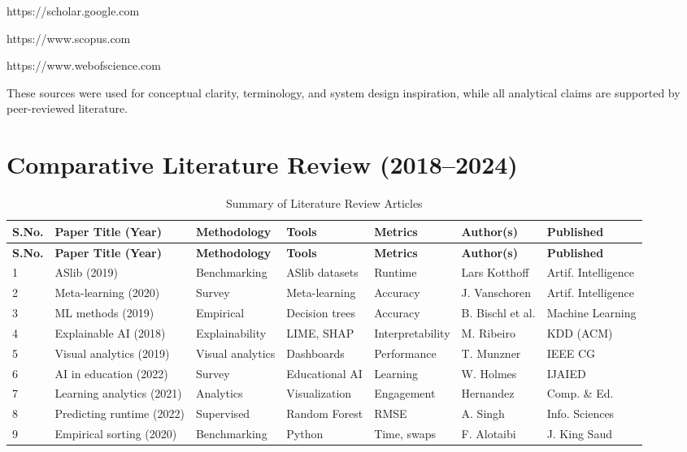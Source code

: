 \documentclass[12pt,a4paper,oneside,openany]{report}
\begin{document}
https://scholar.google.com

https://www.scopus.com

https://www.webofscience.com

These sources were used for conceptual clarity, terminology, and system design inspiration, while all analytical claims are supported by peer-reviewed literature.




\section*{Comparative Literature Review (2018--2024)}

\begin{spacing}{1.0}
\scriptsize
\begin{longtable}{@{}lp{3cm}p{2cm}p{2cm}p{1.5cm}p{2cm}l@{}}
\caption{Summary of Literature Review Articles}\\
\toprule
\textbf{S.No.} & \textbf{Paper Title (Year)} & \textbf{Methodology} & \textbf{Tools} & \textbf{Metrics} & \textbf{Author(s)} & \textbf{Published} \\ \midrule
\endfirsthead
\toprule
\textbf{S.No.} & \textbf{Paper Title (Year)} & \textbf{Methodology} & \textbf{Tools} & \textbf{Metrics} & \textbf{Author(s)} & \textbf{Published} \\ \midrule
\endhead
1 & ASlib (2019) & Benchmarking & ASlib datasets & Runtime & Lars Kotthoff & Artif. Intelligence \\
2 & Meta-learning (2020) & Survey & Meta-learning & Accuracy & J. Vanschoren & Artif. Intelligence \\
3 & ML methods (2019) & Empirical & Decision trees & Accuracy & B. Bischl et al. & Machine Learning \\
4 & Explainable AI (2018) & Explainability & LIME, SHAP & Interpretability & M. Ribeiro & KDD (ACM) \\
5 & Visual analytics (2019) & Visual analytics & Dashboards & Performance & T. Munzner & IEEE CG \\
6 & AI in education (2022) & Survey & Educational AI & Learning & W. Holmes & IJAIED \\
7 & Learning analytics (2021) & Analytics & Visualization & Engagement & Hernandez & Comp. \& Ed. \\
8 & Predicting runtime (2022) & Supervised & Random Forest & RMSE & A. Singh & Info. Sciences \\
9 & Empirical sorting (2020) & Benchmarking & Python & Time, swaps & F. Alotaibi & J. King Saud \\

\end{longtable}
\end{spacing}
\end{document}
